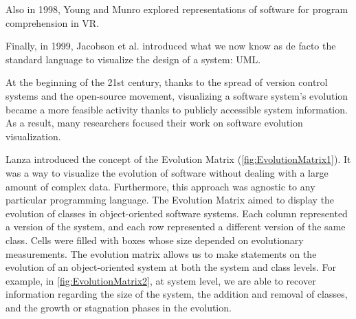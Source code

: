 Also in 1998, Young and Munro \cite{Young1998} explored representations of software for program comprehension in VR. 

Finally, in 1999, Jacobson et al. \cite{Jacobson1999} introduced what we now know as de facto the standard language to visualize the design of a system: UML. 



At the beginning of the 21st century, thanks to the spread of version control systems and the open-source movement, 
visualizing a software system's evolution became a more feasible activity thanks to publicly accessible system information.
As a result, many researchers focused their work on software evolution visualization.

Lanza \cite{Lanza2001} introduced the concept of the Evolution Matrix (\autoref{fig:EvolutionMatrix1}). 
It was a way to visualize the evolution of software without dealing with a large amount of complex data. 
Furthermore, this approach was agnostic to any particular programming language. 
The Evolution Matrix aimed to display the evolution of classes in object-oriented software systems. 
Each column represented a version of the system, and each row represented a different version of the same class.
Cells were filled with boxes whose size depended on evolutionary measurements. 
The evolution matrix allows us to make statements on the evolution of an object-oriented system at both the system and class levels. For example, in \autoref{fig:EvolutionMatrix2}, at system level, we are able to recover information regarding the size of the system, the addition and removal of classes, and the growth or stagnation phases in the evolution. 


